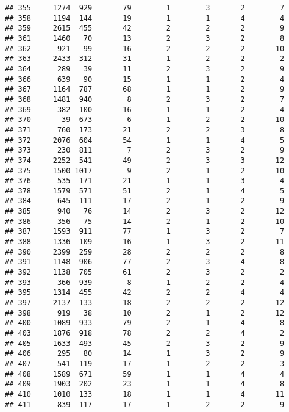 \documentclass[]{article}
\begin{document}
\begin{verbatim}
## 355     1274  929       79        1        3       2        7
## 358     1194  144       19        1        1       4        4
## 359     2615  455       42        2        2       2        9
## 361     1460   70       13        2        3       2        8
## 362      921   99       16        2        2       2       10
## 363     2433  312       31        1        2       2        2
## 364      289   39       11        2        3       2        9
## 366      639   90       15        1        1       2        4
## 367     1164  787       68        1        1       2        9
## 368     1481  940        8        2        3       2        7
## 369      382  100       16        1        1       2        4
## 370       39  673        6        1        2       2       10
## 371      760  173       21        2        2       3        8
## 372     2076  604       54        1        1       4        5
## 373      230  811        7        2        3       2        9
## 374     2252  541       49        2        3       3       12
## 375     1500 1017        9        2        1       2       10
## 376      535  171       21        1        1       3        4
## 378     1579  571       51        2        1       4        5
## 384      645  111       17        2        1       2        9
## 385      940   76       14        2        3       2       12
## 386      356   75       14        2        1       2       10
## 387     1593  911       77        1        3       2        7
## 388     1336  109       16        1        3       2       11
## 390     2399  259       28        2        2       2        8
## 391     1148  906       77        2        3       4        8
## 392     1138  705       61        2        3       2        2
## 393      366  939        8        1        2       2        4
## 395     1314  455       42        2        2       4        4
## 397     2137  133       18        2        2       2       12
## 398      919   38       10        2        1       2       12
## 400     1089  933       79        2        1       4        8
## 403     1876  918       78        2        2       4        2
## 405     1633  493       45        2        3       2        9
## 406      295   80       14        1        3       2        9
## 407      541  119       17        1        2       2        3
## 408     1589  671       59        1        1       4        4
## 409     1903  202       23        1        1       4        8
## 410     1010  133       18        1        1       4       11
## 411      839  117       17        1        2       2        9

\end{verbatim}
\end{document}
